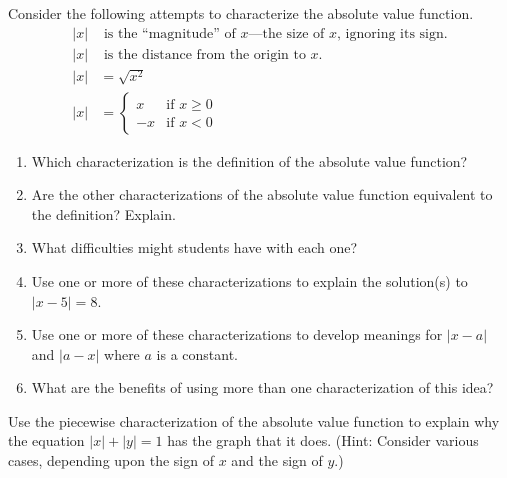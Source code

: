 \begin{prob}
Consider the following attempts to characterize the absolute value function.    
\begin{align}
|x| & \text{ is the ``magnitude'' of $x$---the size of $x$, ignoring its sign.} \\
|x| & \text{ is the distance from the origin to $x$.} \\
|x| & = \sqrt{x^2} \\
|x| & =
  \begin{cases}
   x    & \text{if } x \geq 0 \\
   -x   & \text{if } x < 0
  \end{cases}
\end{align}

\begin{enumerate}
\item Which characterization is the definition of the absolute value function? 
\item Are the other characterizations of the absolute value function equivalent to the definition?  Explain.  
\item What difficulties might students have with each one?  
\item Use one or more of these characterizations to explain the solution(s) to $|x-5|=8$.  
\item Use one or more of these characterizations to develop meanings for $|x-a|$ and $|a-x|$ where $a$ is a constant.  
\item What are the benefits of using more than one characterization of this idea?  
\end{enumerate}
\end{prob}

\begin{prob}
Use the piecewise characterization of the absolute value function to explain why the equation $|x| + |y| = 1$ has the graph that it does. (Hint:  Consider various cases, depending upon the sign of $x$ and the sign of $y$.)
\end{prob}

